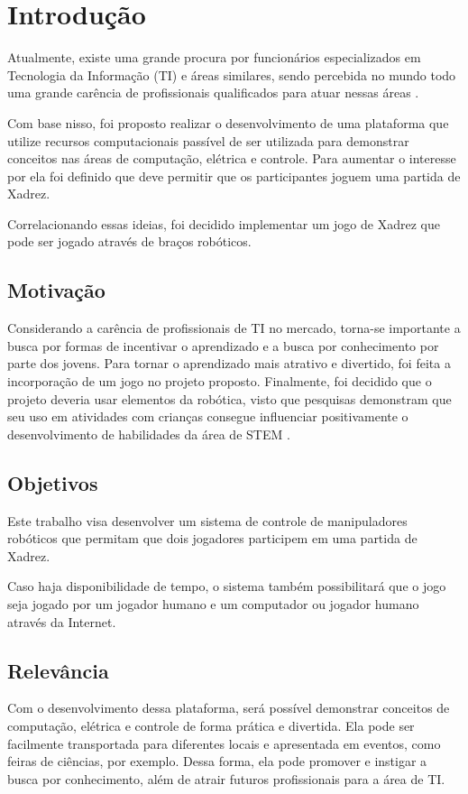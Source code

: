 \chapter[Introdução]{Introdução}
\label{cap:introducao}

Atualmente, existe uma grande procura por funcionários especializados em Tecnologia da Informação (TI) e áreas similares,
sendo percebida no mundo todo uma grande carência de profissionais qualificados para atuar nessas áreas \cite{shortage_of_workers}.

Com base nisso, foi proposto realizar o desenvolvimento de uma plataforma que utilize recursos computacionais passível de ser utilizada para demonstrar conceitos nas áreas de computação, elétrica e controle.
Para aumentar o interesse por ela foi definido que deve permitir que os participantes joguem uma partida de Xadrez.

Correlacionando essas ideias, foi decidido implementar um jogo de Xadrez que pode ser jogado através de braços robóticos.

\section[Motivação]{Motivação}

Considerando a carência de profissionais de TI no mercado, torna-se importante a busca por formas de incentivar o aprendizado e a busca por conhecimento por parte dos jovens.
Para tornar o aprendizado mais atrativo e divertido, foi feita a incorporação de um jogo no projeto proposto.
Finalmente, foi decidido que o projeto deveria usar elementos da robótica, visto que pesquisas demonstram que seu uso em atividades com crianças consegue influenciar positivamente o desenvolvimento de habilidades da área de STEM \cite{technology_for_stem}.

\section[Objetivos]{Objetivos}

Este trabalho visa desenvolver um sistema de controle de manipuladores robóticos que permitam que dois jogadores participem em uma partida de Xadrez.

Caso haja disponibilidade de tempo, o sistema também possibilitará que o jogo seja jogado por um jogador humano e um computador ou jogador humano através da Internet.

\section[Relevância]{Relevância}

Com o desenvolvimento dessa plataforma, será possível demonstrar conceitos de computação, elétrica e controle de forma prática e divertida.
Ela pode ser facilmente transportada para diferentes locais e apresentada em eventos, como feiras de ciências, por exemplo.
Dessa forma, ela pode promover e instigar a busca por conhecimento, além de atrair futuros profissionais para a área de TI.